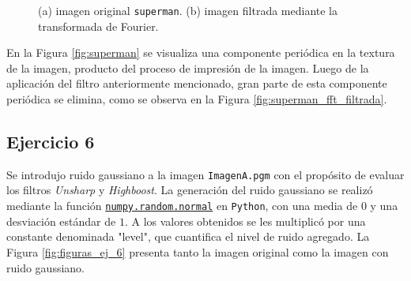 \documentclass[11pt, twocolumn]{article}
\begin{document}
\begin{figure}[htbp]
  \centering
  \hfill
  \hfill
  \caption{(a) imagen original \texttt{superman}. (b) imagen filtrada mediante la transformada de Fourier.}
  \label{fig:figuras_fft_filtrada_ej_5} 
\end{figure}

En la Figura \ref{fig:superman} se visualiza una componente periódica en la textura de la imagen, producto del proceso de impresión de la imagen. Luego de la aplicación del filtro anteriormente mencionado, gran parte de esta componente periódica se elimina, como se observa en la Figura \ref{fig:superman_fft_filtrada}. 

\subsection*{Ejercicio 6}
Se introdujo ruido gaussiano a la imagen \texttt{ImagenA.pgm} con el propósito de evaluar los filtros \textit{Unsharp} y \textit{Highboost}. La generación del ruido gaussiano se realizó mediante la función \href{https://numpy.org/doc/stable/reference/random/generated/numpy.random.normal.html}{\texttt{numpy.random.normal}} en \texttt{Python}, con una media de $0$ y una desviación estándar de $1$. A los valores obtenidos se les multiplicó por una constante denominada "level", que cuantifica el nivel de ruido agregado. La Figura \ref{fig:figuras_ej_6} presenta tanto la imagen original como la imagen con ruido gaussiano.
\end{document}
